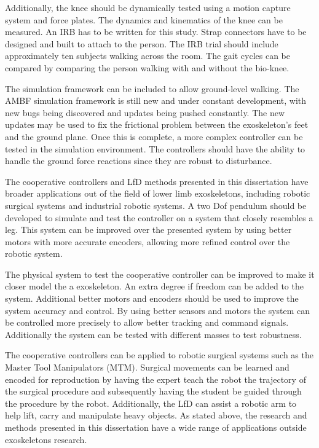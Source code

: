 Additionally, the knee should be dynamically tested using a motion capture system and force plates. The dynamics and kinematics of the knee can be measured. An IRB has to be written for this study. Strap connectors have to be designed and built to attach to the person. The IRB trial should include approximately ten subjects walking across the room. The gait cycles can be compared by comparing the person walking with and without the bio-knee. 

The simulation framework can be included to allow ground-level walking. The AMBF simulation framework is still new and under constant development, with new bugs being discovered and updates being pushed constantly. The new updates may be used to fix the frictional problem between the exoskeleton's feet and the ground plane. Once this is complete, a more complex controller can be tested in the simulation environment. The controllers should have the ability to handle the ground force reactions since they are robust to disturbance. 

The cooperative controllers and LfD methods presented in this dissertation have broader applications out of the field of lower limb exoskeletons, including robotic surgical systems and industrial robotic systems. A two Dof pendulum should be developed to simulate and test the controller on a system that closely resembles a leg. This system can be improved over the presented system by using better motors with more accurate encoders, allowing more refined control over the robotic system. 

The physical system to test the cooperative controller can be improved to make it closer model the a exoskeleton. An extra degree if freedom can be added to the system. Additional better motors and encoders should be used to improve the system accuracy and control. By using better sensors and motors the system can be controlled more precisely to allow better tracking and command signals. Additionally the system can be tested with different masses to test robustness.   

The cooperative controllers can be applied to robotic surgical systems such as the Master Tool Manipulators (MTM). Surgical movements can be learned and encoded for reproduction by having the expert teach the robot the trajectory of the surgical procedure and subsequently having the student be guided through the procedure by the robot. Additionally, the LfD can assist a robotic arm to help lift, carry and manipulate heavy objects. As stated above, the research and methods presented in this dissertation have a wide range of applications outside exoskeletons research.  








   